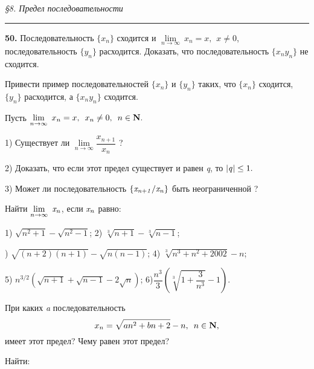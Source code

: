 \documentclass{article}
\begin{document}
\begin{center}
    {\it \S8. Предел последовательности} 
    \smallskip\hrule width 350 pt\smallskip
\end{center}

{\bf 50.} Последовательность $ \{x_n\} $  сходится и  $ \lim\limits_{n \to \infty}\ x_n = x, \hspace{5pt}x \ne 0 $, последовательность $ \{y_n\} $ расходится. Доказать, что последовательность $ \{x_ny_n\} $ не сходится. 

\par{} Привести пример последовательностей $ \{x_n\} $ и $ \{y_n\} $ таких, что $ \{x_n\} $ сходится, $ \{y_n\} $ расходится, а $ \{x_ny_n\} $ сходится.

\par{} Пусть $ \lim\limits_{n \to \infty}\ x_n = x, \hspace{5pt}x_n \ne 0, \hspace{5pt}n \in {\bf N.} $

1) Существует ли  $ \lim\limits_{n \to \infty} \dfrac{x_{n+1}}{x_n} $ ?

2) Доказать, что если этот предел существует и равен {\it q}, то $ |{\it q}|\le 1.$

3) Может ли последовательность $ \{{\it x_{n+1}/x_n}\} $ быть неограниченной ?

\par{} Найти $ \lim\limits_{n \to \infty}\ {\it x_n} $, если $ {\it x_n} $ равно:

1) $ \sqrt{n^2 + 1} - \sqrt{n^2 - 1} $; \hspace{10pt} 2) $ \sqrt[3]{n + 1} - \sqrt[3]{n - 1} $;

\par{}) $ \sqrt{(n + 2)(n + 1)} - \sqrt{n(n - 1)} $; \hspace{10pt} 4) $ \sqrt[3]{n^3 + n^2 + 2002} - n $;

5) $ n^{3/2}(\sqrt{n + 1} + \sqrt{n - 1} - 2\sqrt{n}) $; \hspace{10pt} 6)$ \dfrac{n^3}{3}\left(\sqrt[3]{1 + \dfrac{3}{n^3}} - 1 \right) $.

\par{} При каких {\it a} последовательность
\[
  x_n = \sqrt{an^2 + bn + 2} - n, \hspace{5pt}n \in {\bf N},
\]  
имеет этот предел? Чему равен этот предел?

\par{} Найти:
\end{document}
